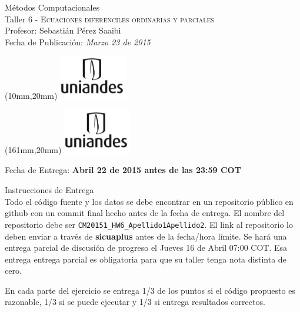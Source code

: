 \documentclass[11pt,letterpaper]{exam}
\begin{document}
\begin{center}
{\Large Métodos Computacionales} \\
Taller 6 - \textsc{Ecuaciones diferenciles ordinarias y parciales} \\
Profesor: Sebastián Pérez Saaibi\\
Fecha de Publicación: {\small \it Marzo 23 de 2015}\\
\end{center}

\begin{textblock*}{40mm}(10mm,20mm)
  \includegraphics[width=3cm]{logoUniandes.png}
\end{textblock*}

\begin{textblock*}{40mm}(161mm,20mm)
  \includegraphics[width=3cm]{logoUniandes.png}
\end{textblock*}

\vspace{0.5cm}

{\Large Fecha de Entrega:  \bf Abril 22 de 2015 antes de las 23:59 COT}

\vspace{0.5cm}

{\Large Instrucciones de Entrega}\\

Todo el código fuente y los datos se debe encontrar en un repositorio público en github con un commit final hecho antes de la fecha de entrega. El nombre del repositorio debe ser \newline \verb+CM20151_HW6_Apellido1Apellido2+. El link al repositorio lo deben enviar a través de \textbf{sicuaplus} antes de la fecha/hora límite. Se hará una entrega parcial de discusión de progreso el Jueves 16 de Abril 07:00 COT. Esa entrega entrega parcial es obligatoria para que su taller tenga nota distinta de cero.

En cada parte del ejercicio se entrega 1/3 de los puntos si el código propuesto es razonable, 1/3 si se puede ejecutar y 1/3 si entrega resultados correctos.
\end{document}
